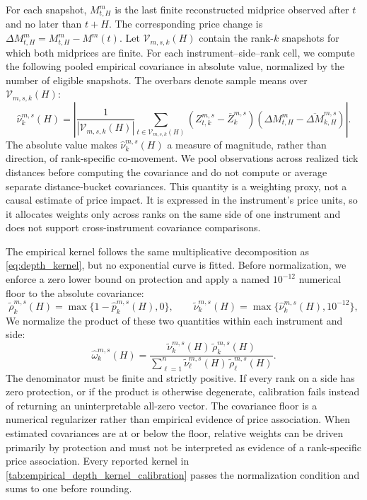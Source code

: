 \documentclass[11pt]{article}
\begin{document}
For each snapshot, $M^m_{t,H}$ is the last finite reconstructed midprice observed after $t$ and no later than $t+H$.
The corresponding price change is $\Delta M^m_{t,H}=M^m_{t,H}-M^m(t)$. Let $\mathcal{V}_{m,s,k}(H)$ contain the rank-$k$
snapshots for which both midprices are finite. For each instrument--side--rank cell, we compute the following pooled
empirical covariance in absolute value, normalized by the number of eligible snapshots. The overbars denote sample means over
$\mathcal{V}_{m,s,k}(H)$:
\begin{equation}
    \widehat\nu^{m,s}_{k}(H)
    =
    \left|
        \frac{1}{|\mathcal{V}_{m,s,k}(H)|}
        \sum_{t\in\mathcal{V}_{m,s,k}(H)}
        \left(Z^{m,s}_{t,k}-\overline Z^{m,s}_{k}\right)
        \left(\Delta M^m_{t,H}-\overline{\Delta M}^{m,s}_{k,H}\right)
    \right|.
    \label{eq:empirical_visibility_covariance}
\end{equation}
The absolute value makes $\widehat\nu^{m,s}_{k}(H)$ a measure of magnitude, rather than direction, of rank-specific
co-movement. We pool observations across realized tick distances before computing the covariance and do not compute or
average separate distance-bucket covariances. This quantity is a weighting proxy, not a causal estimate of price impact.
It is expressed in the instrument's price units, so it allocates weights only across ranks on the same side of one
instrument and does not support cross-instrument covariance comparisons.

The empirical kernel follows the same multiplicative decomposition as \cref{eq:depth_kernel}, but no exponential curve is
fitted. Before normalization, we enforce a zero lower bound on protection and apply a named $10^{-12}$ numerical floor to
the absolute covariance:
\begin{equation}
    \widetilde\rho^{m,s}_{k}(H)=\max\{1-\widehat p^{m,s}_{k}(H),0\},
    \qquad
    \widetilde\nu^{m,s}_{k}(H)=\max\{\widehat\nu^{m,s}_{k}(H),10^{-12}\},
    \label{eq:empirical_kernel_floors}
\end{equation}
We normalize the product of these two quantities within each instrument and side:
\begin{equation}
    \widehat\omega^{m,s}_{k}(H)
    =
    \frac{
        \widetilde\nu^{m,s}_{k}(H)\,\widetilde\rho^{m,s}_{k}(H)
    }{
        \sum_{\ell=1}^{n}\widetilde\nu^{m,s}_{\ell}(H)\,\widetilde\rho^{m,s}_{\ell}(H)
    }.
    \label{eq:empirical_depth_kernel}
\end{equation}
The denominator must be finite and strictly positive. If every rank on a side has zero protection, or if the product is
otherwise degenerate, calibration fails instead of returning an uninterpretable all-zero vector. The covariance floor is a
numerical regularizer rather than empirical evidence of price association. When estimated covariances are at or below the
floor, relative weights can be driven primarily by protection and must not be interpreted as evidence of a rank-specific
price association. Every reported kernel in \cref{tab:empirical_depth_kernel_calibration} passes the normalization condition and
sums to one before rounding.
\end{document}
